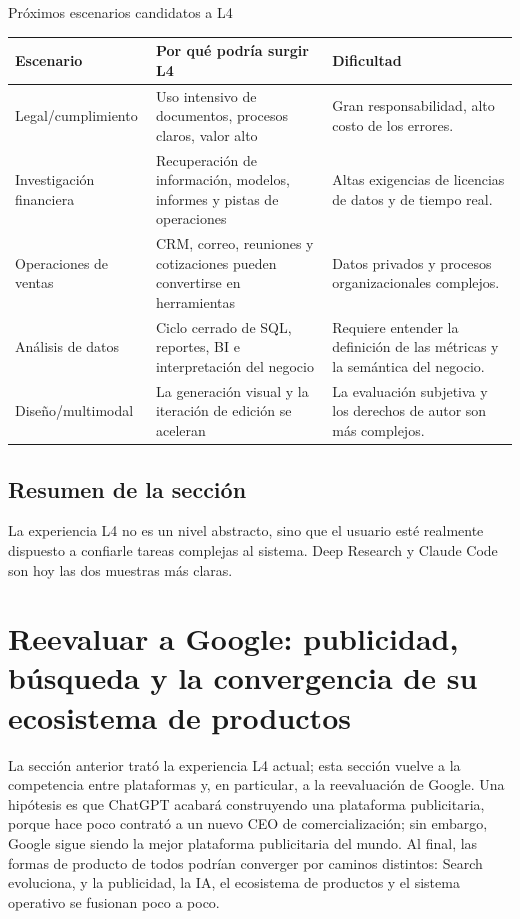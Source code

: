\documentclass[a4paper]{article}
\begin{document}
\begin{knowledgebox}{Próximos escenarios candidatos a L4}
\begin{tabularx}{\textwidth}{p{}p{}X}
\toprule
Escenario & Por qué podría surgir L4 & Dificultad \\
\midrule
Legal/cumplimiento & Uso intensivo de documentos, procesos claros, valor alto & Gran responsabilidad, alto costo de los errores. \\
Investigación financiera & Recuperación de información, modelos, informes y pistas de operaciones & Altas exigencias de licencias de datos y de tiempo real. \\
Operaciones de ventas & CRM, correo, reuniones y cotizaciones pueden convertirse en herramientas & Datos privados y procesos organizacionales complejos. \\
Análisis de datos & Ciclo cerrado de SQL, reportes, BI e interpretación del negocio & Requiere entender la definición de las métricas y la semántica del negocio. \\
Diseño/multimodal & La generación visual y la iteración de edición se aceleran & La evaluación subjetiva y los derechos de autor son más complejos. \\
\bottomrule
\end{tabularx}
\end{knowledgebox}

\subsection{Resumen de la sección}

La experiencia L4 no es un nivel abstracto, sino que el usuario esté realmente dispuesto a confiarle tareas complejas al sistema. Deep Research y Claude Code son hoy las dos muestras más claras.
\section{Reevaluar a Google: publicidad, búsqueda y la convergencia de su ecosistema de productos}

La sección anterior trató la experiencia L4 actual; esta sección vuelve a la competencia entre plataformas y, en particular, a la reevaluación de Google. Una hipótesis es que ChatGPT acabará construyendo una plataforma publicitaria, porque hace poco contrató a un nuevo CEO de comercialización; sin embargo, Google sigue siendo la mejor plataforma publicitaria del mundo. Al final, las formas de producto de todos podrían converger por caminos distintos: Search evoluciona, y la publicidad, la IA, el ecosistema de productos y el sistema operativo se fusionan poco a poco.
\end{document}
